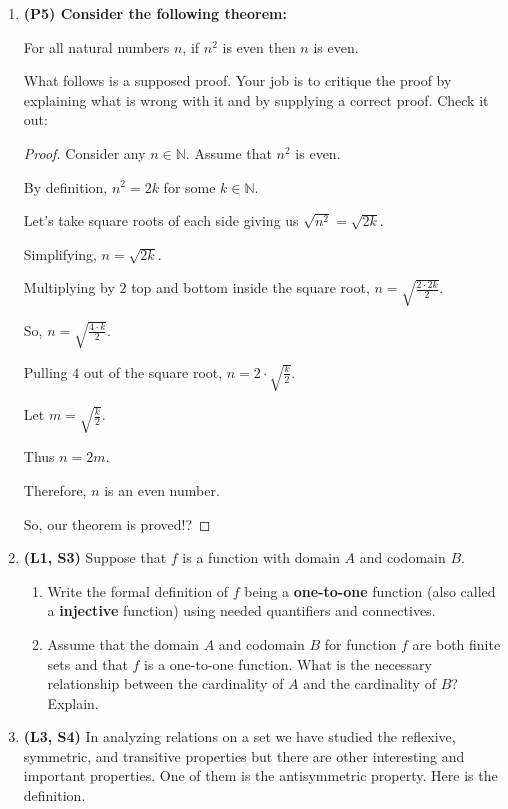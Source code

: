 \documentclass[12pt]{article}
\begin{document}
\pagestyle{empty}

\begin{enumerate}


\item 
\textbf{(P5)
Consider the following theorem:} 

For all natural numbers $n$, if $n^{2}$ is even then $n$ is even. 

What follows is a supposed proof. Your job is to critique the proof by explaining what is wrong with it and by supplying a correct proof. Check it out:

    \begin{proof} Consider any $n \in \mathbb{N}$. Assume that $n^{2}$ is even. 
    
    By definition, $n^{2} = 2k$ for some $k \in \mathbb{N}$.
    
    Let's take square roots of each side giving us $\sqrt{n^{2}}=\sqrt{2k}$. 
    
    Simplifying, $n=\sqrt{2k}$.  
    
    Multiplying by $2$ top and bottom inside the square root, $n=\sqrt{\frac{2\cdot 2k}{2}}$. 
    
    So, $n=\sqrt{\frac{4\cdot k}{2}}$.  
    
    Pulling $4$ out of the square root, $n=2\cdot\sqrt{\frac{k}{2}}$.
    
    Let $m=\sqrt{\frac{k}{2}}$.
    
    Thus $n=2m$.
    
    Therefore, $n$ is an even number.
    
    So, our theorem is proved!?
    \end{proof}

\item 
\textbf{(L1, S3)} Suppose that $f$ is a function with domain $A$ and codomain $B$.

\begin{enumerate}
	\item
	Write the formal definition of $f$ being a \textbf{one-to-one} function (also called a \textbf{injective} function) using needed quantifiers and connectives.
	\item
	Assume that the domain $A$ and codomain $B$ for function $f$ are both finite sets and that $f$ is a one-to-one function. What is the necessary relationship between the cardinality of $A$ and the cardinality of $B$?  Explain.
\end{enumerate}


\item
\textbf{(L3, S4)} In analyzing relations on a set we have studied the reflexive, symmetric, and transitive properties but there are other interesting and important properties. One of them is the antisymmetric property. Here is the definition.


\end{enumerate}
\end{document}
